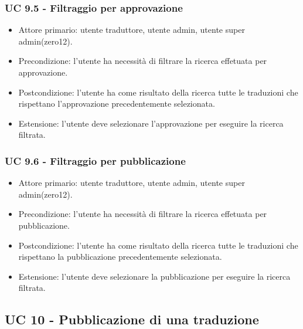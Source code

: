     \subsubsection*{UC 9.5 - Filtraggio per approvazione}
        \begin{itemize}
            \item Attore primario: utente traduttore, utente admin, utente super admin(zero12).
            \item Precondizione: l'utente ha necessità di filtrare la ricerca effetuata per approvazione.
            \item Postcondizione: l'utente ha come risultato della ricerca tutte le traduzioni che rispettano l'approvazione precedentemente selezionata. 
            \item Estensione: l'utente deve selezionare l'approvazione per eseguire la ricerca filtrata.
        \end{itemize}  
    \subsubsection*{UC 9.6 - Filtraggio per pubblicazione}
        \begin{itemize}
            \item Attore primario: utente traduttore, utente admin, utente super admin(zero12).
            \item Precondizione: l'utente ha necessità di filtrare la ricerca effetuata per pubblicazione.
            \item Postcondizione: l'utente ha come risultato della ricerca tutte le traduzioni che rispettano la pubblicazione precedentemente selezionata. 
            \item Estensione: l'utente deve selezionare la pubblicazione per eseguire la ricerca filtrata.
        \end{itemize} 
\subsection*{UC 10 - Pubblicazione di una traduzione} %
